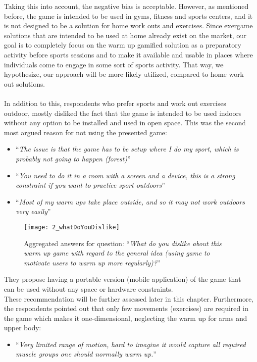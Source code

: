 Taking this into account, the negative bias is acceptable. However, as mentioned before, the game is intended to be used in gyms, fitness and sports centers, and it is not designed to be a solution for home work outs and exercises. Since exergame solutions that are intended to be used at home already exist on the market, our goal is to completely focus on the warm up gamified solution as a preparatory activity before sports sessions and to make it available and usable in places where individuals come to engage in some sort of sports activity. That way, we hypothesize, our approach will be more likely utilized, compared to home work out solutions. \\\\In addition to this, respondents who prefer sports and work out exercises outdoor, mostly disliked the fact that the game is intended to be used indoors without any option to be installed and used in open space. This was the second most argued reason for not using the presented game:
\begin{itemize}
\item ``\textit{The issue is that the game has to be setup where I do my sport, which is probably not going to happen (forest)}''
\item ``\textit{You need to do it in a room with a screen and a device, this is a strong constraint if you want to practice sport outdoors}''
\item ``\textit{Most of my warm ups take place outside, and so it may not work outdoors very easily}''
\end{itemize}
\begin{figure}[h]
    \centering
    \texttt{[image: 2\_whatDoYouDislike]}
    \caption{Aggregated answers for question: ``\textit{What do you dislike about this warm up game with regard to the general idea (using game to motivate users to warm up more regularly)?}''}
    \label{fig:2_whatDoYouDislike}
\end{figure}
They propose having a portable version (mobile application) of the game that can be used without any space or hardware constraints. \\These recommendation will be further assessed later in this chapter. Furthermore, the respondents pointed out that only few movements (exercises) are required in the game which makes it one-dimensional, neglecting the warm up for arms and upper body:
\begin{itemize}
\item ``\textit{Very limited range of motion, hard to imagine it would capture all required muscle groups one should normally warm up.}''
\end{itemize}
